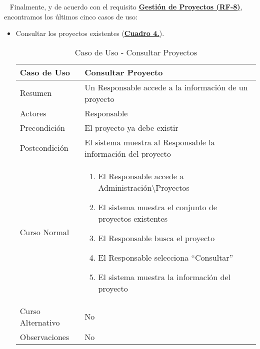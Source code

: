 \newpage~
Finalmente, y de acuerdo con el requisito \textbf{\hyperref[tab:rfGestProyectos]{Gestión de Proyectos (RF-8)}}, encontramos los últimos cinco casos de uso:
\begin{itemize}
	\item \addtocounter{tabla}{1} Consultar los proyectos existentes (\textbf{\hyperref[tab:curConsultarProyectos]{Cuadro 4.}}).
		\begin{table}[!htbp]
		  \centering  \addtocounter{casouso}{1}
		  \begin{tabular}{|l | p{100mm}|}
		    \textbf{Caso de Uso}  & \textbf{Consultar Proyecto} \\ \hline
		    Resumen 		 & Un Responsable accede a la información de un proyecto \\ \hline
		    Actores  		 & Responsable \\ \hline
		    Precondición  	 & El proyecto ya debe existir \\ \hline
		    Postcondición  	 & El sistema muestra al Responsable la información del proyecto \\ \hline
		    Curso Normal   	 & \begin{enumerate}
			  \item El Responsable accede a Administración\textbackslash Proyectos
			  \item El sistema muestra el conjunto de proyectos existentes
			  \item El Responsable busca el proyecto
			  \item El Responsable selecciona ``Consultar''
			  \item El sistema muestra la información del proyecto
		    \end{enumerate}  \\ \hline
		    Curso Alternativo  & No  \\ \hline
		    Observaciones 	 & No  \\ \hline
		  \end{tabular}
		  \caption{Caso de Uso  - Consultar Proyectos}
		  \label{tab:curConsultarProyectos}
		\end{table}
		\FloatBarrier


\end{itemize}

